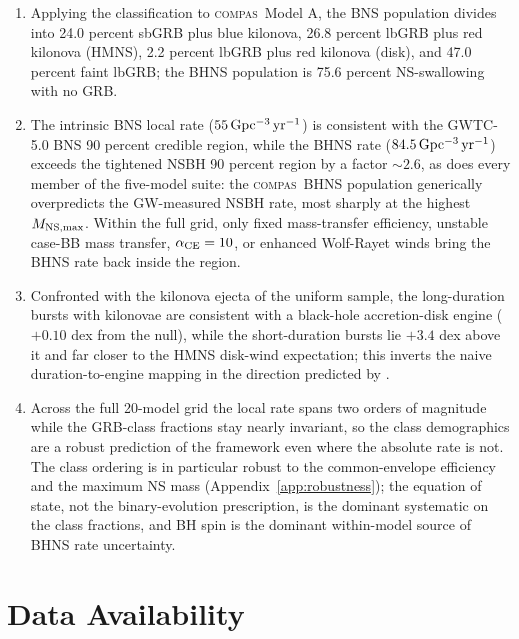 \documentclass[twocolumn,amsmath]{aastex702}
\newcommand{\compas}{\textsc{compas}}
\newcommand{\Gpcyr}{{\rm Gpc^{-3}\,yr^{-1}}}
\begin{document}
\begin{enumerate}
\item Applying the \citet{gottlieb2023,gottlieb2024} classification to \compas\
Model A, the BNS population divides into 24.0 percent sbGRB plus blue kilonova,
26.8 percent lbGRB plus red kilonova (HMNS), 2.2 percent lbGRB plus red kilonova
(disk), and 47.0 percent faint lbGRB; the BHNS population is 75.6 percent
NS-swallowing with no GRB.
\item The intrinsic BNS local rate ($55\,\Gpcyr$) is consistent with the
GWTC-5.0 BNS 90 percent credible region, while the BHNS rate ($84.5\,\Gpcyr$)
exceeds the tightened NSBH 90 percent region by a factor $\sim 2.6$, as does
every member of the five-model suite: the \compas\ BHNS population
generically overpredicts the GW-measured NSBH rate, most sharply at the
highest $M_{\rm NS,max}$. Within the full grid, only fixed mass-transfer
efficiency, unstable case-BB mass transfer, $\alpha_{\rm CE} = 10$, or
enhanced Wolf-Rayet winds bring the BHNS rate back inside the region.
\item Confronted with the kilonova ejecta of the \citet{rastinejad2024} uniform
sample, the long-duration bursts with kilonovae are consistent with a
black-hole accretion-disk engine ($+0.10$ dex from the null), while the
short-duration bursts lie $+3.4$ dex above it and far closer to the HMNS
disk-wind expectation; this inverts the naive duration-to-engine mapping in
the direction predicted by \citet{gottlieb2024}.
\item Across the full 20-model \citet{broekgaarden2021} grid the local rate
spans two orders of magnitude while the GRB-class fractions stay nearly
invariant, so the class demographics are a robust prediction of the framework
even where the absolute rate is not. The class ordering is in particular robust
to the common-envelope efficiency and the maximum NS mass
(Appendix~\ref{app:robustness}); the equation of state, not the binary-evolution
prescription, is the dominant systematic on the class fractions, and BH spin is
the dominant within-model source of BHNS rate uncertainty.
\end{enumerate}

\section*{Data Availability}
\end{document}
